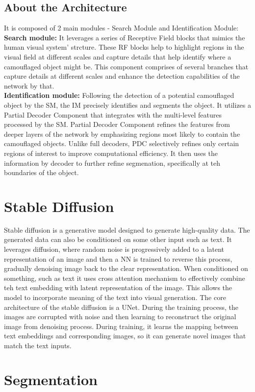\documentclass{article}
\begin{document}
\subsection{About the Architecture}
It is composed of 2 main modules - Search Module and Identification Module:\\
\textbf{Search module: } It leverages a series of Receptive Field blocks that mimics the human visual
system' strcture. These RF blocks help to highlight regions in the visual field at different scales and capture details
that help identify where a camouflaged object might be. This component comprises of several branches that capture details
at different scales and enhance the detection capabilities of the network by that.\\
\textbf{Identification module: } Following the detection of a potential camouflaged object by the SM, the IM precisely identifies
and segments the object. It utilizes a Partial Decoder Component that integrates with the multi-level features processed by the SM.
Partial Decoder Component refines the features from deeper layers of the network by emphasizing regions most likely to contain the
camouflaged objects. Unlike full decoders, PDC selectively refines only certain regions of interest to improve computational
efficiency. It then uses the information by decoder to further refine segmenation, specifically at teh boundaries of the object.
\section{Stable Diffusion}
Stable diffusion is a generative model designed to generate high-quality data. The generated data can also be conditioned
on some other input such as text. It leverages diffusion, where random noise is progressively added to a latent representation of an image
and then a NN is trained to reverse this process, gradually denoising image back to the clear representation. When conditioned on something,
such as text it uses cross attention mechanism to effectively combine teh text embedding with latent representation of the image.
This allows the model to incorporate meaning of the text into visual generation. The core architecture of the stable diffusion is
a UNet. During the training process, the images are corrupted with noise and then learning to reconstruct the original
image from denoising process. During training, it learns the mapping between text embeddings and corresponding images, so it can generate novel images
that match the text inputs.
\section{Segmentation}
\end{document}
